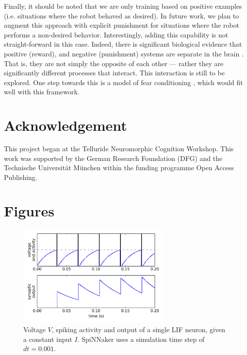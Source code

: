 \documentclass{frontiersSCNS}
\begin{document}
Finally, it should be noted that we are only training based on positive 
examples (i.e. situations where the robot behaved as desired). In future work,
we plan to augment this approach with explicit punishment for situations where 
the robot performs a non-desired behavior. Interestingly, adding this capability
is not straight-forward in this case.  Indeed, there is significant biological 
evidence that positive (reward), and negative (punishment) systems are separate 
in the brain \citep{boureau2010}. That is, they are not simply the opposite of 
each other --- rather they are significantly different processes that interact. 
This interaction is still to be explored. One step towards this is a model
of fear conditioning \citep	{kolbeck2013fear}, which would fit well with this framework.


\section*{Acknowledgement}

This project began at the Telluride Neuromorphic Cognition Workshop. 
This work was supported by the German Research Foundation (DFG) and the 
Technische Universit{\"a}t M{\"u}nchen within the funding programme Open Access Publishing.




\section*{Figures}

\begin{figure}[h!]
\centering
\includegraphics[width=3in]{../figures/neuron.png}
\caption{Voltage $V$, spiking activity and output of a single LIF neuron, given a constant input $I$.
SpiNNaker uses a simulation time step of $dt=0.001$.}
\label{Neuron}
\end{figure}
\end{document}
